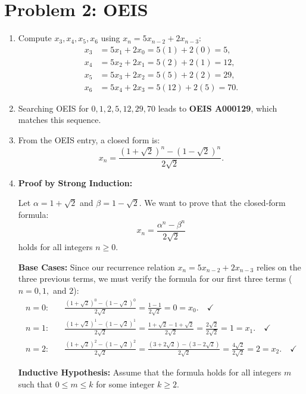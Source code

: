 \documentclass[11pt]{article}
\begin{document}
\section*{Problem 2: OEIS}
\begin{enumerate}[label=\textbf{(\alph*)}]

\item Compute $x_3, x_4, x_5, x_6$ using $x_n = 5x_{n-2} + 2x_{n-3}$:
\begin{align*}
  x_3 &= 5x_1 + 2x_0 = 5(1) + 2(0) = 5,\\
  x_4 &= 5x_2 + 2x_1 = 5(2) + 2(1) = 12,\\
  x_5 &= 5x_3 + 2x_2 = 5(5) + 2(2) = 29,\\
  x_6 &= 5x_4 + 2x_3 = 5(12) + 2(5) = 70.
\end{align*}

\item Searching OEIS for $0, 1, 2, 5, 12, 29, 70$ leads to \textbf{OEIS A000129}, which matches this sequence.

\item From the OEIS entry, a closed form is:
\[
  x_n = \frac{(1+\sqrt{2})^n - (1-\sqrt{2})^n}{2 \sqrt{2}}.
\]

\item \textbf{Proof by Strong Induction:}

Let $\alpha = 1+\sqrt{2}$ and $\beta = 1-\sqrt{2}$. We want to prove that the closed-form formula:
\[
  x_n = \frac{\alpha^n - \beta^n}{2\sqrt{2}}
\]
holds for all integers $n \ge 0$.

\textbf{Base Cases:} Since our recurrence relation $x_n = 5x_{n-2} + 2x_{n-3}$ relies on the three previous terms, we must verify the formula for our first three terms ($n=0, 1,$ and $2$):
\begin{align*}
  n=0: \quad & \frac{(1+\sqrt{2})^0 - (1-\sqrt{2})^0}{2\sqrt{2}} = \frac{1 - 1}{2\sqrt{2}} = 0 = x_0. \quad \checkmark \\
  n=1: \quad & \frac{(1+\sqrt{2})^1 - (1-\sqrt{2})^1}{2\sqrt{2}} = \frac{1+\sqrt{2} - 1 + \sqrt{2}}{2\sqrt{2}} = \frac{2\sqrt{2}}{2\sqrt{2}} = 1 = x_1. \quad \checkmark \\
  n=2: \quad & \frac{(1+\sqrt{2})^2 - (1-\sqrt{2})^2}{2\sqrt{2}} = \frac{(3+2\sqrt{2}) - (3-2\sqrt{2})}{2\sqrt{2}} = \frac{4\sqrt{2}}{2\sqrt{2}} = 2 = x_2. \quad \checkmark
\end{align*}

\textbf{Inductive Hypothesis:} Assume that the formula holds for all integers $m$ such that $0 \le m \le k$ for some integer $k \ge 2$. 


\end{enumerate}
\end{document}
